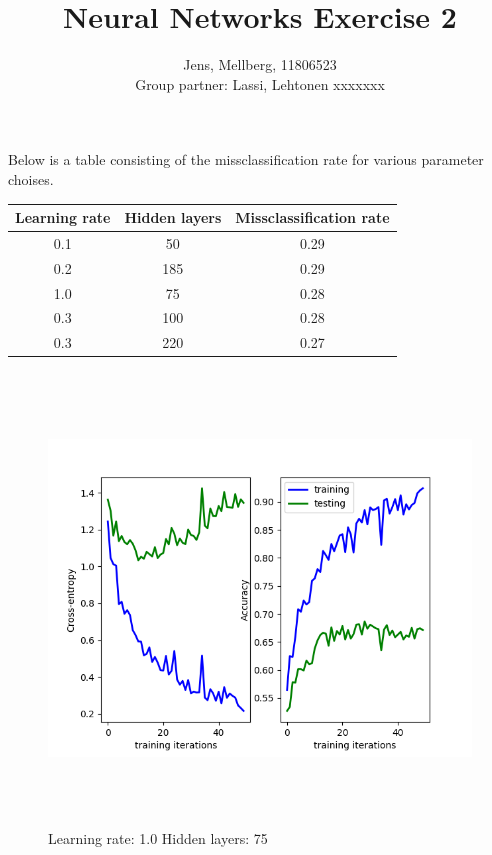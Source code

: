 \documentclass[a4paper]{article}
\title{Neural Networks Exercise 2}
\author{Jens, Mellberg, 11806523\\
		Group partner: Lassi, Lehtonen xxxxxxx}
\begin{document}
\maketitle


Below is a table consisting of the missclassification rate for various parameter choises. 


\begin{center}
	    \begin{tabular}{ |c|c|c|} 
 	        \hline
	        \textbf{Learning rate } & \textbf{Hidden layers} &\textbf{Missclassification rate} \\
	        \hline
	        0.1 & 50 & 0.29\\
 	        0.2 & 185 & 0.29\\
 	        1.0 & 75 & 0.28\\
 	        0.3 & 100 & 0.28\\
 	        0.3 & 220 & 0.27\\
 	        \hline
        \end{tabular}
    \end{center}
    
    
    
    

\begin{figure}[h]
\caption{Learning rate: 1.0 Hidden layers: 75}
\centering
\includegraphics[width=15cm, height=12cm]{LR10HL75}
\end{figure}
\end{document}
